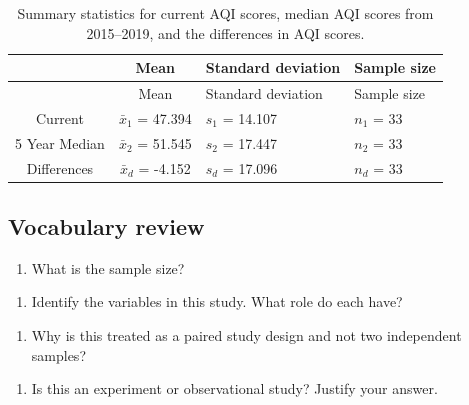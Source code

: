 \documentclass[
]{report}
\providecommand{\tightlist}{%
  \setlength{\itemsep}{0pt}\setlength{\parskip}{0pt}}
\begin{document}
\vspace{.2in}

\begin{longtable}[]{@{}ccll@{}}
\caption{Summary statistics for current AQI scores, median AQI scores from 2015--2019, and the differences in AQI scores.}\tabularnewline
\toprule
& Mean & Standard deviation & Sample size\tabularnewline
\midrule
\endfirsthead
\toprule
& Mean & Standard deviation & Sample size\tabularnewline
\midrule
\endhead
Current & \(\bar{x}_1\) = 47.394 & \(s_1\) = 14.107 & \(n_1\) = 33\tabularnewline
5 Year Median & \(\bar{x}_2\) = 51.545 & \(s_2\) = 17.447 & \(n_2\) = 33\tabularnewline
Differences & \(\bar{x}_d\) = -4.152 & \(s_d\) = 17.096 & \(n_d\) = 33\tabularnewline
\bottomrule
\end{longtable}

\newpage

\hypertarget{vocabulary-review}{%
\subsection*{Vocabulary review}\label{vocabulary-review}}

\begin{enumerate}
\def\labelenumi{\arabic{enumi}.}
\tightlist
\item
  What is the sample size?
\end{enumerate}

\vspace{0.5in}

\begin{enumerate}
\def\labelenumi{\arabic{enumi}.}
\setcounter{enumi}{1}
\tightlist
\item
  Identify the variables in this study. What role do each have?
\end{enumerate}

\vspace{.8in}

\begin{enumerate}
\def\labelenumi{\arabic{enumi}.}
\setcounter{enumi}{2}
\tightlist
\item
  Why is this treated as a paired study design and not two independent samples?
\end{enumerate}

\vspace{1in}

\begin{enumerate}
\def\labelenumi{\arabic{enumi}.}
\setcounter{enumi}{3}
\tightlist
\item
  Is this an experiment or observational study? Justify your answer.
\end{enumerate}
\end{document}

